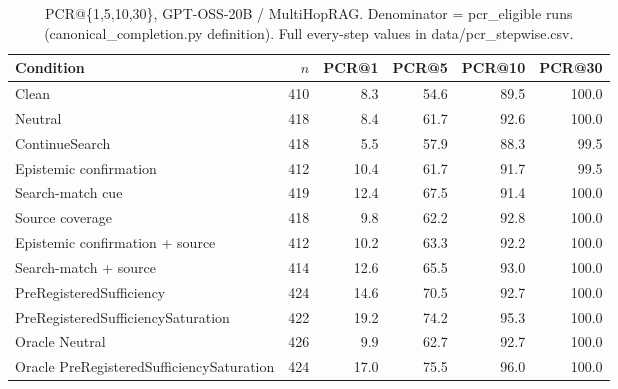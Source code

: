 \begin{table}[t]
\centering
\caption{PCR@\{1,5,10,30\}, GPT-OSS-20B / MultiHopRAG. Denominator = pcr\_eligible runs (canonical\_completion.py definition). Full every-step values in data/pcr_stepwise.csv.}
\begin{tabular}{lrrrrr}
\toprule
Condition & $n$ & PCR@1 & PCR@5 & PCR@10 & PCR@30 \\
\midrule
Clean & 410 & 8.3 & 54.6 & 89.5 & 100.0 \\
Neutral & 418 & 8.4 & 61.7 & 92.6 & 100.0 \\
ContinueSearch & 418 & 5.5 & 57.9 & 88.3 & 99.5 \\
Epistemic confirmation & 412 & 10.4 & 61.7 & 91.7 & 99.5 \\
Search-match cue & 419 & 12.4 & 67.5 & 91.4 & 100.0 \\
Source coverage & 418 & 9.8 & 62.2 & 92.8 & 100.0 \\
Epistemic confirmation + source & 412 & 10.2 & 63.3 & 92.2 & 100.0 \\
Search-match + source & 414 & 12.6 & 65.5 & 93.0 & 100.0 \\
PreRegisteredSufficiency & 424 & 14.6 & 70.5 & 92.7 & 100.0 \\
PreRegisteredSufficiencySaturation & 422 & 19.2 & 74.2 & 95.3 & 100.0 \\
Oracle Neutral & 426 & 9.9 & 62.7 & 92.7 & 100.0 \\
Oracle PreRegisteredSufficiencySaturation & 424 & 17.0 & 75.5 & 96.0 & 100.0 \\
\bottomrule
\end{tabular}
\end{table}

